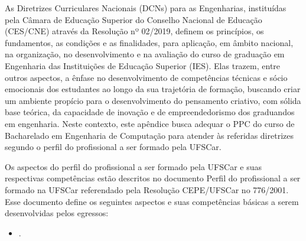 

As Diretrizes Curriculares Nacionais (DCNs) para as Engenharias, instituídas pela Câmara de Educação Superior do Conselho Nacional de Educação (CES/CNE) através da Resolução nº 02/2019, definem os princípios, os fundamentos, as condições e as finalidades, para aplicação, em âmbito nacional, na organização, no desenvolvimento e na avaliação do curso de graduação em Engenharia das Instituições de Educação Superior (IES). Elas trazem, entre outros aspectos, a ênfase no desenvolvimento de competências técnicas e sócio emocionais dos estudantes ao longo da sua trajetória de formação, buscando criar um ambiente propício para o desenvolvimento do pensamento criativo, com sólida base teórica, da capacidade de inovação e de empreendedorismo dos graduandos em engenharia. Neste contexto, este apêndice busca adequar o PPC do curso de Bacharelado em Engenharia de Computação para atender às referidas diretrizes segundo o perfil do profissional a ser formado pela UFSCar.




Os aspectos do perfil do profissional a ser formado pela UFSCar e suas respectivas competências estão descritos no documento Perfil do profissional a ser formado na UFSCar \cite{ufscar2008perfil} referendado pela Resolução CEPE/UFSCar no 776/2001. Esse documento define os seguintes aspectos e suas competências básicas a serem desenvolvidas pelos egressos:

\begin{itemize}
    \singlespacing
    \setlength{\itemsep}{0pt}
    \item {}.  %
\end{itemize}

